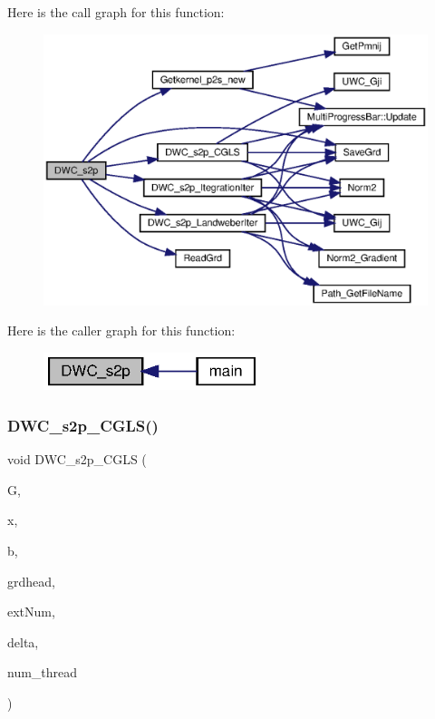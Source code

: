 Here is the call graph for this function\+:
\nopagebreak
\begin{figure}[H]
\begin{center}
\leavevmode
\includegraphics[width=350pt]{Conti2D_8h_ac96429563a5015babafa3274c3f3ec73_ac96429563a5015babafa3274c3f3ec73_cgraph}
\end{center}
\end{figure}
Here is the caller graph for this function\+:\nopagebreak
\begin{figure}[H]
\begin{center}
\leavevmode
\includegraphics[width=179pt]{Conti2D_8h_ac96429563a5015babafa3274c3f3ec73_ac96429563a5015babafa3274c3f3ec73_icgraph}
\end{center}
\end{figure}
\mbox{\label{Conti2D_8h_a6516cfeb71abcf844b32f101e5f77a71_a6516cfeb71abcf844b32f101e5f77a71}} 
\subsubsection{D\+W\+C\+\_\+s2p\+\_\+\+C\+G\+L\+S()}
{\footnotesize\ttfamily void D\+W\+C\+\_\+s2p\+\_\+\+C\+G\+LS (\begin{DoxyParamCaption}\item[{double $\ast$$\ast$}]{G,  }\item[{double $\ast$}]{x,  }\item[{double $\ast$}]{b,  }\item[{\textbf{ Grd\+Head}}]{grdhead,  }\item[{int}]{ext\+Num,  }\item[{double}]{delta,  }\item[{int}]{num\+\_\+thread }\end{DoxyParamCaption})}



